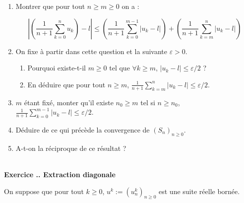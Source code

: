\documentclass{article}
\newcounter{exo}
\newcommand{\exercice}[1][\null]{\textbf{\\ Exercice \thesection.\theexo. #1} \addtocounter{exo}{1}}
\begin{document}
\begin{enumerate}

\item Montrer que pour tout $n \ge m \ge 0$ on a : 

$$ \left| \left( \frac{1}{n+1} \sum_{k=0}^n u_k \right) - l \right| \le \left(\frac{1}{n+1}  \sum_{k=0}^{m-1} \left| u_k - l \right|\right)+ \left(\frac{1}{n+1} \sum_{k=m}^n \left| u_k - l \right|\right)$$

\item On fixe à partir dans cette question et la suivante $\varepsilon > 0$.

\begin{enumerate}

\item Pourquoi existe-t-il $m \ge 0$ tel que $\forall k \ge m$, $|u_k - l | \le \varepsilon /2$ ?

\item En déduire que pour tout $n \ge m$, $\frac{1}{n+1} \sum_{k=m}^n \left| u_k - l \right| \le \varepsilon /2$.

\end{enumerate}

\item $m$ étant fixé, monter qu'il existe $n_0 \ge m$ tel si $n \ge n_0$, $\frac{1}{n+1}  \sum_{k=0}^{m-1} \left| u_k - l \right| \le \varepsilon /2$.

\item Déduire de ce qui précède la convergence de $(S_n)_{n \ge 0}$.

\item A-t-on la réciproque de ce résultat ?




\end{enumerate}





\exercice[Extraction diagonale]

On suppose que pour tout $k \ge 0$, $u^k := (u^k_n)_{n \ge 0}$ est une suite réelle bornée. 
\end{document}
